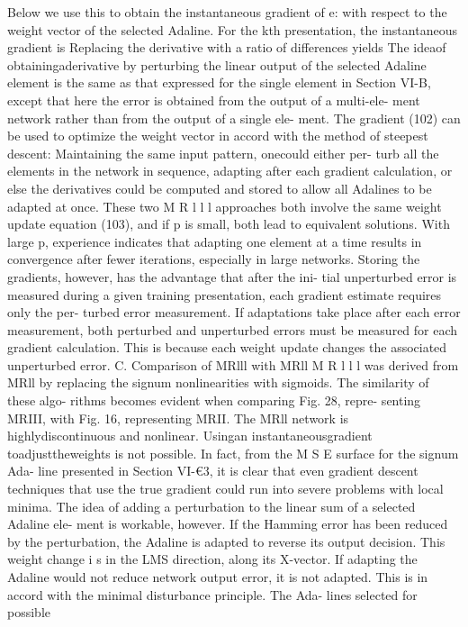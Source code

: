 Below we use this to obtain the instantaneous gradient of e: with
respect to the weight vector of the selected Adaline. For the kth
presentation, the instantaneous gradient is Replacing the derivative
with a ratio of differences yields The ideaof obtainingaderivative by
perturbing the linear output of the selected Adaline element is the same
as that expressed for the single element in Section VI-B, except that
here the error is obtained from the output of a multi-ele- ment network
rather than from the output of a single ele- ment. The gradient (102)
can be used to optimize the weight vector in accord with the method of
steepest descent: Maintaining the same input pattern, onecould either
per- turb all the elements in the network in sequence, adapting after
each gradient calculation, or else the derivatives could be computed and
stored to allow all Adalines to be adapted at once. These two M R l l l
approaches both involve the same weight update equation (103), and if p
is small, both lead to equivalent solutions. With large p, experience
indicates that adapting one element at a time results in convergence
after fewer iterations, especially in large networks. Storing the
gradients, however, has the advantage that after the ini- tial
unperturbed error is measured during a given training presentation, each
gradient estimate requires only the per- turbed error measurement. If
adaptations take place after each error measurement, both perturbed and
unperturbed errors must be measured for each gradient calculation. This
is because each weight update changes the associated unperturbed error.
C. Comparison of MRlll with MRll M R l l l was derived from MRll by
replacing the signum nonlinearities with sigmoids. The similarity of
these algo- rithms becomes evident when comparing Fig. 28, repre-
senting MRIII, with Fig. 16, representing MRII. The MRll network is
highlydiscontinuous and nonlinear. Usingan instantaneousgradient
toadjusttheweights is not possible. In fact, from the M S E surface for
the signum Ada- line presented in Section VI-€3, it is clear that even
gradient descent techniques that use the true gradient could run into
severe problems with local minima. The idea of adding a perturbation to
the linear sum of a selected Adaline ele- ment is workable, however. If
the Hamming error has been reduced by the perturbation, the Adaline is
adapted to reverse its output decision. This weight change i s in the
LMS direction, along its X-vector. If adapting the Adaline would not
reduce network output error, it is not adapted. This is in accord with
the minimal disturbance principle. The Ada- lines selected for possible
